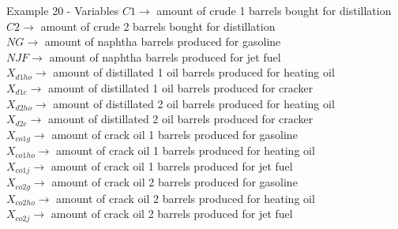 \begin{frame}{Example 20 - Variables}
\small{
$C1  \longrightarrow$ amount of crude 1 barrels bought for distillation \\
$C2  \longrightarrow$ amount of crude 2 barrels bought for distillation \\
$NG  \longrightarrow$ amount of naphtha barrels produced for gasoline \\
$NJF \longrightarrow$ amount of naphtha barrels produced for jet fuel \\
$X_{d1ho} \longrightarrow$ amount of distillated 1 oil barrels produced for heating oil \\
$X_{d1c} \longrightarrow$ amount of distillated 1 oil barrels produced for cracker \\
$X_{d2ho} \longrightarrow$ amount of distillated 2 oil barrels produced for heating oil \\
$X_{d2c} \longrightarrow$ amount of distillated 2 oil barrels produced for cracker \\
$X_{co1g} \longrightarrow$ amount of crack oil 1 barrels produced for gasoline \\
$X_{co1ho} \longrightarrow$ amount of crack oil 1 barrels produced for heating oil \\
$X_{co1j} \longrightarrow$ amount of crack oil 1 barrels produced for jet fuel \\
$X_{co2g} \longrightarrow$ amount of crack oil 2 barrels produced for gasoline \\
$X_{co2ho} \longrightarrow$ amount of crack oil 2 barrels produced for heating oil \\
$X_{co2j} \longrightarrow$ amount of crack oil 2 barrels produced for jet fuel
}
\end{frame}
